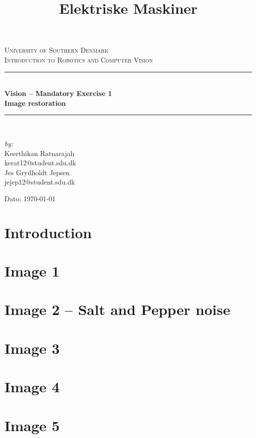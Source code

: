\documentclass[11pt]{article}
\title{Elektriske Maskiner}
\begin{document}
\begin{titlepage}
\begin{center}


\textsc{\LARGE University of Southern Denmark}\\[1.5cm]
\textsc{\Large Introduction to Robotics and Computer Vision}\\[0.5cm]
\vfill
\hrule ~\\[0.3cm]
{ \huge \bfseries Vision -- Mandatory Exercise 1\\ Image restoration\\[0.4cm] }
\hrule ~\\[1.5cm]
\vfill

\begin{minipage}[t]{7.9cm}
\begin{flushleft} \large
\emph{by:}\\
Keerthikan Ratnarajah  \\
kerat12@student.sdu.dk \\
Jes Grydholdt Jepsen   \\
jejep12@student.sdu.dk 
\end{flushleft}
\end{minipage}
\begin{minipage}[t]{7.9cm}
\begin{flushright} \large

\end{flushright}
\end{minipage}

\vspace{1.2cm}
Dato: \today


\end{center}
\end{titlepage}

\listoftodos
\tableofcontents

\newpage
\section{Introduction}


\section{Image 1}


\section{Image 2 -- Salt and Pepper noise}


\section{Image 3}


\section{Image 4}


\section{Image 5}

\end{document}
